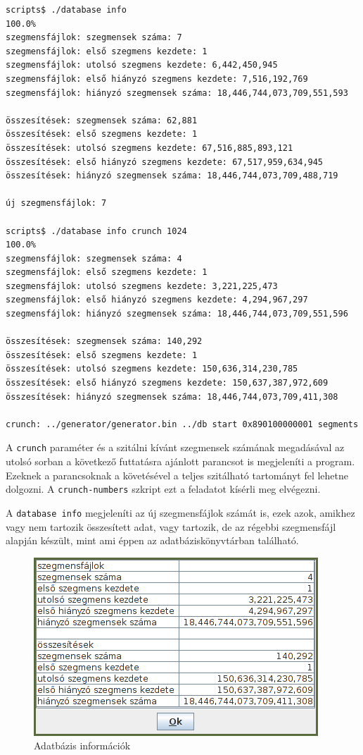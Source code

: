 \begin{lstlisting}[language=bash]
scripts$ ./database info
100.0%
szegmensfájlok: szegmensek száma: 7
szegmensfájlok: első szegmens kezdete: 1
szegmensfájlok: utolsó szegmens kezdete: 6,442,450,945
szegmensfájlok: első hiányzó szegmens kezdete: 7,516,192,769
szegmensfájlok: hiányzó szegmensek száma: 18,446,744,073,709,551,593

összesítések: szegmensek száma: 62,881
összesítések: első szegmens kezdete: 1
összesítések: utolsó szegmens kezdete: 67,516,885,893,121
összesítések: első hiányzó szegmens kezdete: 67,517,959,634,945
összesítések: hiányzó szegmensek száma: 18,446,744,073,709,488,719

új szegmensfájlok: 7

scripts$ ./database info crunch 1024
100.0%                     
szegmensfájlok: szegmensek száma: 4
szegmensfájlok: első szegmens kezdete: 1
szegmensfájlok: utolsó szegmens kezdete: 3,221,225,473
szegmensfájlok: első hiányzó szegmens kezdete: 4,294,967,297
szegmensfájlok: hiányzó szegmensek száma: 18,446,744,073,709,551,596

összesítések: szegmensek száma: 140,292
összesítések: első szegmens kezdete: 1
összesítések: utolsó szegmens kezdete: 150,636,314,230,785
összesítések: első hiányzó szegmens kezdete: 150,637,387,972,609
összesítések: hiányzó szegmensek száma: 18,446,744,073,709,411,308

crunch: ../generator/generator.bin ../db start 0x890100000001 segments 0x400
\end{lstlisting}

A \texttt{crunch} paraméter és a szitálni kívánt szegmensek számának megadásával az utolsó sorban
a következő futtatásra ajánlott parancsot is megjeleníti a program.
Ezeknek a parancsoknak a követésével a teljes szitálható tartományt fel lehetne dolgozni.
A \texttt{crunch-numbers} szkript ezt a feladatot kísérli meg elvégezni.

A \texttt{database info} megjeleníti az új szegmensfájlok számát is, ezek azok, amikhez vagy nem tartozik összesített adat, vagy tartozik, de az régebbi szegmensfájl alapján készült, mint ami éppen az adatbáziskönyvtárban található.

\begin{figure}[H]
\caption{Adatbázis információk}
\centering
\includegraphics[scale=1]{info.png}
\end{figure}

